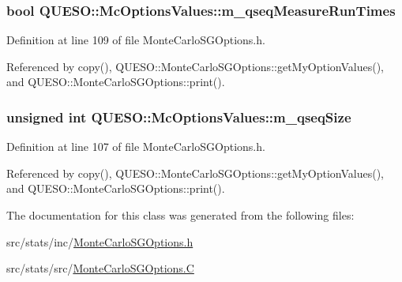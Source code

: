 \hypertarget{class_q_u_e_s_o_1_1_mc_options_values_a4ae449bf66717fbb497b2cf42fb53923}{
\subsubsection[{m\-\_\-qseq\-Measure\-Run\-Times}]{\setlength{\rightskip}{0pt plus 5cm}bool Q\-U\-E\-S\-O\-::\-Mc\-Options\-Values\-::m\-\_\-qseq\-Measure\-Run\-Times}}\label{class_q_u_e_s_o_1_1_mc_options_values_a4ae449bf66717fbb497b2cf42fb53923}


Definition at line 109 of file Monte\-Carlo\-S\-G\-Options.\-h.



Referenced by copy(), Q\-U\-E\-S\-O\-::\-Monte\-Carlo\-S\-G\-Options\-::get\-My\-Option\-Values(), and Q\-U\-E\-S\-O\-::\-Monte\-Carlo\-S\-G\-Options\-::print().

\hypertarget{class_q_u_e_s_o_1_1_mc_options_values_a54e8c4bb7d5ffa7755da7d148019c86e}{
\subsubsection[{m\-\_\-qseq\-Size}]{\setlength{\rightskip}{0pt plus 5cm}unsigned int Q\-U\-E\-S\-O\-::\-Mc\-Options\-Values\-::m\-\_\-qseq\-Size}}\label{class_q_u_e_s_o_1_1_mc_options_values_a54e8c4bb7d5ffa7755da7d148019c86e}


Definition at line 107 of file Monte\-Carlo\-S\-G\-Options.\-h.



Referenced by copy(), Q\-U\-E\-S\-O\-::\-Monte\-Carlo\-S\-G\-Options\-::get\-My\-Option\-Values(), and Q\-U\-E\-S\-O\-::\-Monte\-Carlo\-S\-G\-Options\-::print().



The documentation for this class was generated from the following files\-:\begin{DoxyCompactItemize}
\item 
src/stats/inc/\hyperlink{_monte_carlo_s_g_options_8h}{Monte\-Carlo\-S\-G\-Options.\-h}\item 
src/stats/src/\hyperlink{_monte_carlo_s_g_options_8_c}{Monte\-Carlo\-S\-G\-Options.\-C}\end{DoxyCompactItemize}

